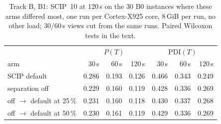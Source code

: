 \begin{table}[t]\centering\small
\begin{tabular}{lrrrrrr}
\toprule
& \multicolumn{3}{c}{$P(T)$} & \multicolumn{3}{c}{PDI$(T)$} \\
arm & 30\,s & 60\,s & 120\,s & 30\,s & 60\,s & 120\,s \\
\midrule
SCIP default & 0.286 & 0.193 & 0.126 & 0.466 & 0.343 & 0.249 \\
separation off & 0.229 & 0.160 & 0.119 & 0.428 & 0.336 & 0.269 \\
off $\to$ default at 25\,\% & 0.231 & 0.160 & 0.118 & 0.430 & 0.337 & 0.268 \\
off $\to$ default at 50\,\% & 0.230 & 0.161 & 0.119 & 0.429 & 0.336 & 0.269 \\
\bottomrule
\end{tabular}
\caption{Track B, B1: SCIP~10 at 120\,s on the 30 B0 instances where these arms differed most, one run per Cortex-X925 core, 8\,GiB per run, no other load; 30/60\,s views cut from the same runs. Paired Wilcoxon tests in the text.}\label{tab:b1}
\end{table}
